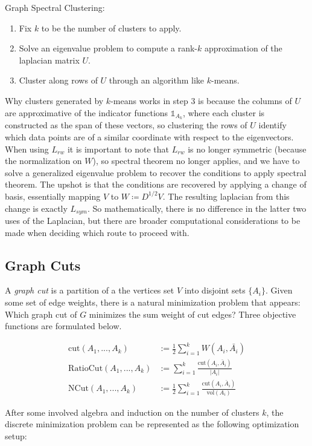 \documentclass[letterpaper,12pt]{article}
\begin{document}
\noindent
Graph Spectral Clustering:
\begin{enumerate}
	\item Fix $k$ to be the number of clusters to apply.
	\item Solve an eigenvalue problem to compute a rank-$k$ approximation of the laplacian matrix $U$.
	\item Cluster along rows of $U$ through an algorithm like $k$-means.
\end{enumerate}

\noindent
Why clusters generated by $k$-means works in step 3 is because the columns of $U$ are approximative of the indicator functions $\mathds{1}_{A_k}$, where each cluster is constructed as the span of these vectors, so clustering the rows of $U$ identify which data points are of a similar coordinate with respect to the eigenvectors. When using $L_{rw}$ it is important to note that $L_{rw}$ is no longer symmetric (because the normalization on $W$), so spectral theorem no longer applies, and we have to solve a generalized eigenvalue problem to recover the conditions to apply spectral theorem. The upshot is that the conditions are recovered by applying a change of basis, essentially mapping $V$ to $W\coloneqq D^{1/2}V$. The resulting laplacian from this change is exactly $L_{sym}$. So mathematically, there is no difference in the latter two uses of the Laplacian, but there are broader computational considerations to be made when deciding which route to proceed with.

\subsection*{Graph Cuts}
A \textit{graph cut} is a partition of a the vertices set $V$ into disjoint sets $\{A_i\}$. Given some set of edge weights, there is a natural minimization problem that appears: Which graph cut of $G$ minimizes the sum weight of cut edges? Three objective functions are formulated below.

\begin{align}
    \text{cut}(A_1, ..., A_k) & := \frac{1}{2} \sum_{i = 1}^k W(A_i, \bar{A_i}) \\
    \text{RatioCut}(A_1, ..., A_k) & := \sum_{i=1}^k \frac{\text{cut}(A_i, \bar{A}_i)}{|A_i|} \\
    \text{NCut}(A_1, ..., A_k) & := \frac{1}{2} \sum_{i=1}^k \frac{\text{cut}(A_i, \bar{A}_i)}{\text{vol}(A_i)}
\end{align}

After some involved algebra and induction on the number of clusters $k$, the discrete minimization problem can be represented as the following optimization setup:
\end{document}
